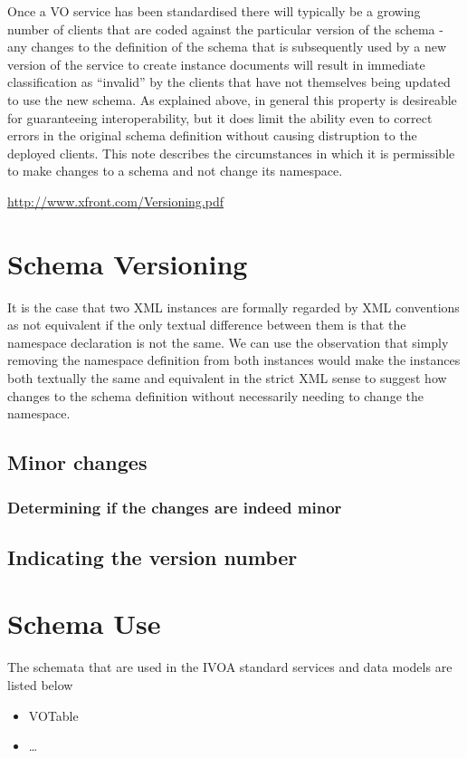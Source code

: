 \documentclass[11pt,a4paper]{ivoa}
\begin{document}
Once a VO service has been standardised there will typically be a growing number
of clients that are coded against the particular version of the
schema - any changes to the definition of the schema that is subsequently used
by a new version of the service to create instance documents will result in
immediate classification as ``invalid'' by the clients that have not themselves being
updated to use the new schema.
As explained above, in general this property is desireable for guaranteeing interoperability, but it does limit
the ability even to correct errors in the original schema definition without
causing distruption to the deployed clients. This note describes the
circumstances in which it is permissible to make changes to a schema and not
change its namespace.

\url{http://www.xfront.com/Versioning.pdf}


\section{Schema Versioning}
It is the case that two XML instances are formally regarded by XML
conventions as not equivalent if the only textual difference between them is
that the namespace declaration is not the same. We
can use the observation that simply removing the namespace definition from both instances
would make the instances both textually the same and equivalent in the strict
XML sense to suggest how changes to the schema definition without necessarily
needing to change the namespace.
\subsection{Minor changes}
\subsubsection{Determining if the changes are indeed minor}
\subsection{Indicating the version number}


\section{Schema Use}
The schemata that are used in the IVOA standard services and data models are
listed below
\begin{itemize}
  \item VOTable
  \item \ldots
\end{itemize}
\end{document}
